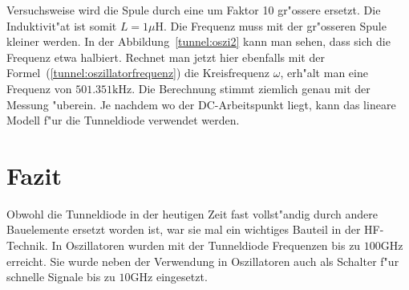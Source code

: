 \begin{refsection}
Versuchsweise wird die Spule durch eine um Faktor 10 gr"ossere ersetzt. 
Die Induktivit"at ist somit $L=1\mu\text{H}$. 
Die Frequenz muss mit der gr"osseren Spule kleiner werden. 
In der Abbildung~\ref{tunnel:oszi2} kann man sehen, dass sich die Frequenz etwa halbiert.
Rechnet man jetzt hier ebenfalls mit der Formel~(\ref{tunnel:oszillatorfrequenz}) die Kreisfrequenz $\omega$, erh"alt man eine Frequenz von $501.351\text{kHz}$.
Die Berechnung stimmt ziemlich genau mit der Messung "uberein.
Je nachdem wo der DC-Arbeitspunkt liegt, kann das lineare Modell f"ur die Tunneldiode verwendet werden.


\section{Fazit}
Obwohl die Tunneldiode in der heutigen Zeit fast vollst"andig durch andere Bauelemente ersetzt worden ist, war sie mal ein wichtiges Bauteil in der HF-Technik.
In Oszillatoren wurden mit der Tunneldiode Frequenzen bis zu $100\text{GHz}$ erreicht.
Sie wurde neben der Verwendung in Oszillatoren auch als Schalter f"ur schnelle Signale bis zu $10\text{GHz}$ eingesetzt.

\printbibliography[heading=subbibliography]
\end{refsection}

